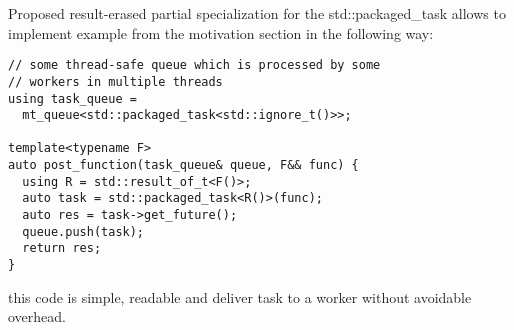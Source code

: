 \documentclass[ebook,openany,10pt,oneside,final]{memoir}
\begin{document}
Proposed result-erased partial specialization for the \mbox{std::packaged_task} allows to implement
example from the motivation section in the following way:

\begin{lstlisting}
// some thread-safe queue which is processed by some
// workers in multiple threads
using task_queue =
  mt_queue<std::packaged_task<std::ignore_t()>>;

template<typename F>
auto post_function(task_queue& queue, F&& func) {
  using R = std::result_of_t<F()>;
  auto task = std::packaged_task<R()>(func);
  auto res = task->get_future();
  queue.push(task);
  return res;
}
\end{lstlisting}
this code is simple, readable and deliver task to a worker without avoidable overhead.
\end{document}
